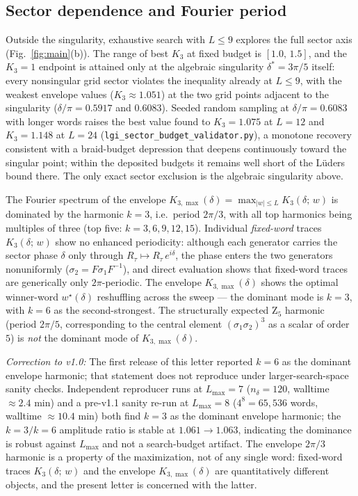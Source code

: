 \documentclass[aps,prx,reprint,amsmath,amssymb,floatfix,nofootinbib,superscriptaddress]{revtex4-2}
\begin{document}
\subsection{Sector dependence and Fourier period}
\label{sec:sector-fourier}

Outside the singularity, exhaustive search with $L \leq 9$ explores
the full sector axis (Fig.~\ref{fig:main}(b)). The range of best
$K_{3}$ at fixed budget is $[1.0,\, 1.5]$, and the $K_{3} = 1$
endpoint is attained only at the algebraic singularity
$\delta^{\ast} = 3\pi/5$ itself: every nonsingular grid sector
violates the inequality already at $L \leq 9$, with the weakest
envelope values ($K_{3} \approx 1.051$) at the two grid points
adjacent to the singularity ($\delta/\pi = 0.5917$ and $0.6083$).
Seeded random sampling at $\delta/\pi = 0.6083$ with longer words
raises the best value found to $K_{3} = 1.075$ at $L = 12$ and
$K_{3} = 1.148$ at $L = 24$
(\texttt{lgi\_sector\_budget\_validator.py}), a monotone recovery
consistent with a braid-budget depression that deepens continuously
toward the singular point; within the deposited budgets it remains
well short of the L\"uders bound there. The only exact sector
exclusion is the algebraic singularity above.

The Fourier spectrum of the envelope
$K_{3,\max}(\delta) = \max_{|w| \leq L} K_{3}(\delta;\,w)$ is
dominated by the harmonic $k=3$, i.e.\ period $2\pi/3$, with all top
harmonics being multiples of three (top five: $k = 3, 6, 9, 12, 15$).
Individual \emph{fixed-word} traces $K_{3}(\delta;\,w)$ show no
enhanced periodicity: although each generator carries the sector
phase $\delta$ only through $R_{\tau} \mapsto R_{\tau}\,e^{i\delta}$,
the phase enters the two generators nonuniformly
($\sigma_{2} = F\sigma_{1}F^{-1}$), and direct evaluation shows that
fixed-word traces are generically only $2\pi$-periodic. The envelope
$K_{3,\max}(\delta)$ shows the optimal winner-word
$w^{\star}(\delta)$ reshuffling across the sweep --- the dominant
mode is $k=3$, with $k=6$ as the second-strongest. The structurally expected
$\mathrm{Z}_{5}$ harmonic (period $2\pi/5$, corresponding to the
central element $(\sigma_{1}\sigma_{2})^{3}$ as a scalar of order
$5$) is \emph{not} the dominant mode of $K_{3,\max}(\delta)$.

\emph{Correction to v1.0:} The first release of this letter reported
$k=6$ as the dominant envelope harmonic; that statement does not
reproduce under larger-search-space sanity checks. Independent
reproducer runs at $L_{\max} = 7$ ($n_{\delta} = 120$, walltime
$\approx 2.4$ min) and a pre-v1.1 sanity re-run at $L_{\max} = 8$
($4^{8} = 65{,}536$ words, walltime $\approx 10.4$ min) both find
$k=3$ as the dominant envelope harmonic; the $k=3 / k=6$ amplitude
ratio is stable at $1.061 \to 1.063$, indicating the dominance is
robust against $L_{\max}$ and not a search-budget artifact. The
envelope $2\pi/3$ harmonic is a property of the maximization, not
of any single word: fixed-word traces $K_{3}(\delta;\,w)$ and the
envelope $K_{3,\max}(\delta)$ are quantitatively different objects,
and the present letter is concerned with the latter.
\end{document}
